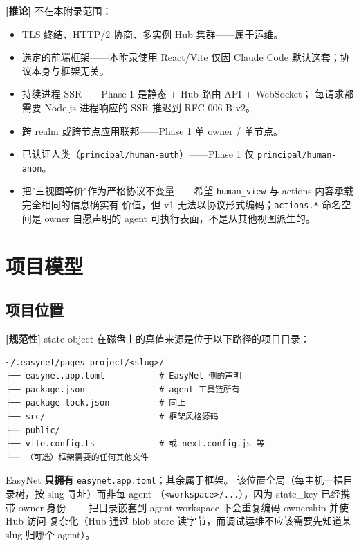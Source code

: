 \documentclass[11pt,a4paper]{article}
\newcommand{\normsv}{\textcolor{normativecolor}{\textbf{[规范性]}}\xspace}
\newcommand{\derived}{\textcolor{derivedcolor}{\textbf{[推论]}}\xspace}
\theoremstyle{definition}
\begin{document}
\derived{} 不在本附录范围：

\begin{itemize}[leftmargin=2.2em,itemsep=0.18em]
    \item TLS 终结、HTTP/2 协商、多实例 Hub 集群——属于运维。
    \item 选定的前端框架——本附录使用 React/Vite 仅因 Claude Code
    默认这套；协议本身与框架无关。
    \item 持续进程 SSR——Phase 1 是静态 + Hub 路由 API + WebSocket；
    每请求都需要 Node.js 进程响应的 SSR 推迟到 RFC-006-B v2。
    \item 跨 realm 或跨节点应用联邦——Phase 1 单 owner / 单节点。
    \item 已认证人类（\texttt{principal/human-auth}）——Phase 1 仅
    \texttt{principal/human-anon}。
    \item 把"三视图等价"作为严格协议不变量——希望
    \texttt{human\_view} 与 actions 内容承载完全相同的信息确实有
    价值，但 v1 无法以协议形式编码；\texttt{actions.*} 命名空间是
    owner 自愿声明的 agent 可执行表面，不是从其他视图派生的。
\end{itemize}

\section{项目模型}
\label{sec:project}

\subsection{项目位置}

\normsv{} state object 在磁盘上的真值来源是位于以下路径的项目目录：

\begin{lstlisting}
~/.easynet/pages-project/<slug>/
├── easynet.app.toml           # EasyNet 侧的声明
├── package.json               # agent 工具链所有
├── package-lock.json          # 同上
├── src/                       # 框架风格源码
├── public/
├── vite.config.ts             # 或 next.config.js 等
└── （可选）框架需要的任何其他文件
\end{lstlisting}

EasyNet \textbf{只拥有} \texttt{easynet.app.toml}；其余属于框架。
该位置全局（每主机一棵目录树，按 slug 寻址）而非每 agent
（\texttt{<workspace>/...}），因为 state\_key 已经携带 owner 身份——
把目录嵌套到 agent workspace 下会重复编码 ownership 并使 Hub 访问
复杂化（Hub 通过 blob store 读字节，而调试运维不应该需要先知道某
slug 归哪个 agent）。
\end{document}
